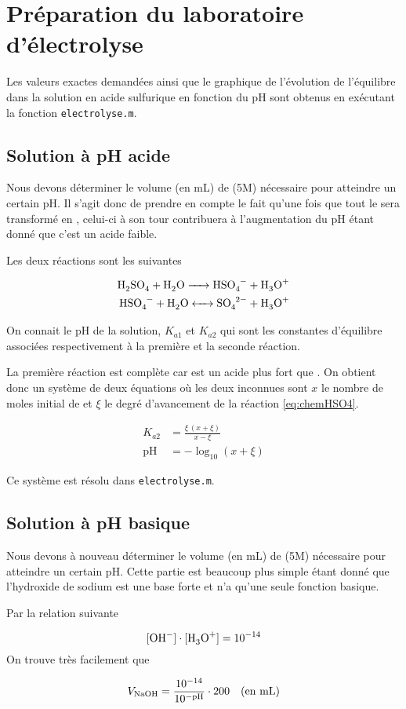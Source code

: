 \section{Préparation du laboratoire d'électrolyse}

Les valeurs exactes demandées ainsi que le graphique de l'évolution de l'équilibre
dans la solution en acide sulfurique en fonction du pH sont obtenus en
exécutant la fonction \texttt{electrolyse.m}.

\subsection{Solution à pH acide}

Nous devons déterminer le volume (en \si{\milli\liter}) de  (5M)
nécessaire pour atteindre un certain pH.
Il s'agit donc de prendre en compte le fait qu'une fois que tout 
le  sera transformé en , celui-ci à son tour contribuera
à l'augmentation du pH étant donné que c'est un acide faible.

Les deux réactions sont les suivantes

\begin{align}
	\ce{H2SO4 + H2O -> HSO4- + H3O+} \nonumber \\
	\ce{HSO4- + H2O <-> SO4^{2-} + H3O+} \label{eq:chemHSO4}
\end{align}

On connait le pH de la solution, $K_{a1}$ et $K_{a2}$ qui sont les constantes 
d'équilibre associées respectivement à la première et la seconde réaction.

La première réaction est complète car  est un acide plus fort que .
On obtient donc un système de deux équations où les deux inconnues
sont $x$ le nombre de moles initial de  et $\xi$
le degré d'avancement de la réaction \ref{eq:chemHSO4}.

\begin{align*}
	K_{a2} &= \frac{\xi \, (x + \xi)}{x - \xi} \\
	\text{pH} &= - \log_{10}{(x + \xi)} 
\end{align*}

Ce système est résolu dans \texttt{electrolyse.m}.

\subsection{Solution à pH basique}

Nous devons à nouveau déterminer le volume (en \si{\milli\liter}) 
de  (5M) nécessaire pour atteindre un certain pH.
Cette partie est beaucoup plus simple étant donné que l'hydroxide de sodium
est une base forte et n'a qu'une seule fonction basique.

Par la relation suivante

\[
	[\ce{OH-}] \cdot [\ce{H3O+}] = 10^{-14} 
\]
On trouve très facilement que 

\[
	V_{\ce{NaOH}} = \frac{10^{-14}}{10^{- \text{pH}}} \cdot 200 
	\quad \text{(en \si{\milli\liter})}
\]




